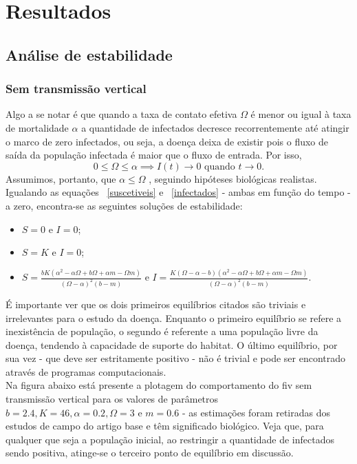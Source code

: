 \documentclass{article}
\begin{document}
\section{Resultados}
\subsection{Análise de estabilidade}
\subsubsection{Sem transmissão vertical}
Algo a se notar é que quando a taxa de contato efetiva $\Omega$  é menor ou igual à taxa de mortalidade $\alpha$ a quantidade de infectados decresce recorrentemente até atingir o marco de zero infectados, ou seja, a doença deixa de existir pois o fluxo de saída da população infectada é maior que o fluxo de entrada. \cite{base} Por isso, 
$$ 0 \leq \Omega \leq \alpha \implies I(t)\rightarrow 0 \mbox{ quando } t\rightarrow 0.$$
Assumimos, portanto, que $\alpha \leq \Omega$ , seguindo hipóteses biológicas realistas. 
Igualando as equações ~\ref{suscetiveis} e ~\ref{infectados} - ambas em função do tempo - a zero, encontra-se as seguintes soluções de estabilidade:
\begin{itemize}
\item $S=0 \mbox{ e } I=0$;
\item $S=K \mbox{ e } I=0$;
\item $S=\frac{bK(\alpha^2 - \alpha\Omega + b\Omega + \alpha m - \Omega m)}{(\Omega-\alpha)^2(b-m)} \mbox{ e } I=\frac{K(\Omega-\alpha-b)(\alpha^2-\alpha\Omega +b\Omega + \alpha m-\Omega m)}{(\Omega -\alpha)^2(b-m)}$.
\end{itemize}
É importante ver que os dois primeiros equilíbrios citados são triviais e irrelevantes para o estudo da doença. Enquanto o primeiro equilíbrio se refere a inexistência de população, o segundo é referente a uma população livre da doença, tendendo à capacidade de suporte do habitat. O último equilíbrio, por sua vez  - que deve ser estritamente positivo - não é trivial e pode ser encontrado através de programas computacionais.\\

\noindent Na figura abaixo está presente a plotagem do comportamento do \gls{fiv} sem transmissão vertical para os valores de parâmetros $b=2.4,K=46,\alpha=0.2, \Omega=3 \mbox{ e } m=0.6$ - as estimações foram retiradas dos estudos de campo do artigo base e têm significado biológico. Veja que, para qualquer que seja a população inicial, ao restringir a quantidade de infectados sendo positiva, atinge-se o terceiro ponto de equilíbrio em discussão.
\end{document}
